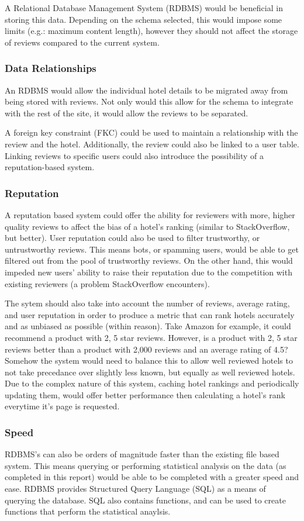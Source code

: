 \documentclass[a4paper]{article}
\begin{document}
A Relational Database Management System (RDBMS) would be beneficial in storing this data.
Depending on the schema selected, this would impose some limits (e.g.: maximum content length), however they should not affect the storage of reviews compared to the current system.

\subsubsection{Data Relationships}
An RDBMS would allow the individual hotel details to be migrated away from being stored with reviews.
Not only would this allow for the schema to integrate with the rest of the site, it would allow the reviews to be separated.

A foreign key constraint (FKC) could be used to maintain a relationship with the review and the hotel.
Additionally, the review could also be linked to a user table.
Linking reviews to specific users could also introduce the possibility of a reputation-based system.

\subsubsection{Reputation}
A reputation based system could offer the ability for reviewers with more, higher quality reviews to affect the bias of a hotel's ranking (similar to StackOverflow, but better).
User reputation could also be used to filter trustworthy, or untrustworthy reviews.
This means bots, or spamming users, would be able to get filtered out from the pool of trustworthy reviews.
On the other hand, this would impeded new users' ability to raise their reputation due to the competition with existing reviewers (a problem StackOverflow encounters).

The sytem should also take into account the number of reviews, average rating, and user reputation in order to produce a metric that can rank hotels accurately and as unbiased as possible (within reason).
Take Amazon for example, it could recommend a product with 2, 5 star reviews.
However, is a product with 2, 5 star reviews better than a product with 2,000 reviews and an average rating of 4.5?
Somehow the system would need to balance this to allow well reviewed hotels to not take precedance over slightly less known, but equally as well reviewed hotels.
Due to the complex nature of this system, caching hotel rankings and periodically updating them, would offer better performance then calculating a hotel's rank everytime it's page is requested.

\subsubsection{Speed}
RDBMS's can also be orders of magnitude faster than the existing file based system.
This means querying or performing statistical analysis on the data (as completed in this report) would be able to be completed with a greater speed and ease.
RDBMS provides Structured Query Language (SQL) as a means of querying the database.
SQL also contains functions, and can be used to create functions that perform the statistical anaylsis.
\end{document}
